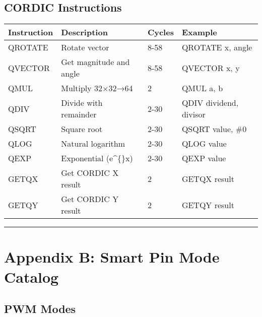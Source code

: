 \documentclass[11pt]{book}
\begin{document}
\hypertarget{cordic-instructions}{%
\subsection{CORDIC Instructions}\label{cordic-instructions}}

\begin{longtable}[]{@{}llll@{}}
\toprule
Instruction & Description & Cycles & Example \\
\midrule
\endhead
QROTATE & Rotate vector & 8-58 & QROTATE x, angle \\
QVECTOR & Get magnitude and angle & 8-58 & QVECTOR x, y \\
QMUL & Multiply 32×32→64 & 2 & QMUL a, b \\
QDIV & Divide with remainder & 2-30 & QDIV dividend, divisor \\
QSQRT & Square root & 2-30 & QSQRT value, \#0 \\
QLOG & Natural logarithm & 2-30 & QLOG value \\
QEXP & Exponential (e\^{}\{\}x) & 2-30 & QEXP value \\
GETQX & Get CORDIC X result & 2 & GETQX result \\
GETQY & Get CORDIC Y result & 2 & GETQY result \\
\bottomrule
\end{longtable}

\begin{center}\rule{0.5\linewidth}{0.5pt}\end{center}

\hypertarget{appendix-b-smart-pin-mode-catalog}{%
\section{Appendix B: Smart Pin Mode
Catalog}\label{appendix-b-smart-pin-mode-catalog}}

\hypertarget{pwm-modes}{%
\subsection{PWM Modes}\label{pwm-modes}}
\end{document}
